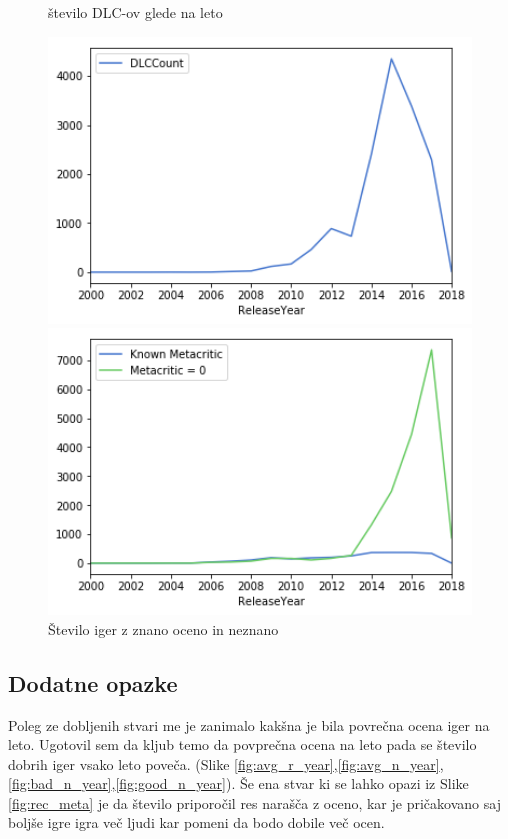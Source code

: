 \documentclass[a4paper]{article}
\begin{document}
\begin{figure}[h]
    \centering
    \begin{minipage}{0.45\textwidth}
			\centering
			\caption{število DLC-ov glede na leto \label{fig:dlc_per_year}}
			\includegraphics[width=1\textwidth,keepaspectratio]{graf_stevilo_dlc_leto.png}
    \end{minipage}\hfill
    \begin{minipage}{0.45\textwidth}
			\centering
			\caption{Število iger z znano oceno in neznano \label{fig:known_unknown}}
			\includegraphics[width=1\textwidth,keepaspectratio]{KnownvsUnknown.png}
    \end{minipage}
\end{figure}
\newpage
\subsection{Dodatne opazke}
Poleg ze dobljenih stvari me je zanimalo kakšna je bila povrečna ocena iger na leto. Ugotovil sem da kljub temo da povprečna ocena na leto pada se število dobrih iger vsako leto poveča.
(Slike \ref{fig:avg_r_year},\ref{fig:avg_n_year},\ref{fig:bad_n_year},\ref{fig:good_n_year}).
Še ena stvar ki se lahko opazi iz Slike \ref{fig:rec_meta} je da število priporočil res narašča z oceno, kar je pričakovano saj boljše igre igra več ljudi kar pomeni da bodo dobile več ocen.
\end{document}
